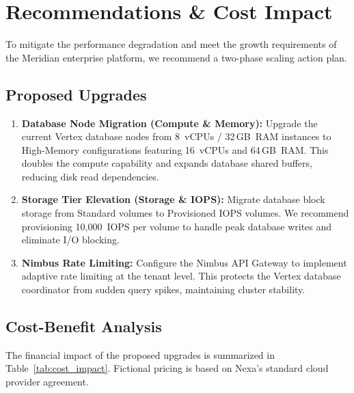 \section{Recommendations \& Cost Impact}
\label{sec:recommendations}
To mitigate the performance degradation and meet the growth requirements of the Meridian enterprise platform, we recommend a two-phase scaling action plan.

\subsection{Proposed Upgrades}
\begin{enumerate}
  \item \textbf{Database Node Migration (Compute \& Memory):}
  Upgrade the current Vertex database nodes from 8~vCPUs / 32\,GB~RAM instances to High-Memory configurations featuring 16~vCPUs and 64\,GB~RAM. This doubles the compute capability and expands database shared buffers, reducing disk read dependencies.
  \item \textbf{Storage Tier Elevation (Storage \& IOPS):}
  Migrate database block storage from Standard volumes to Provisioned IOPS volumes. We recommend provisioning 10,000~IOPS per volume to handle peak database writes and eliminate I/O blocking.
  \item \textbf{Nimbus Rate Limiting:}
  Configure the Nimbus API Gateway to implement adaptive rate limiting at the tenant level. This protects the Vertex database coordinator from sudden query spikes, maintaining cluster stability.
\end{enumerate}

\subsection{Cost-Benefit Analysis}
The financial impact of the proposed upgrades is summarized in Table~\ref{tab:cost_impact}. Fictional pricing is based on Nexa's standard cloud provider agreement.

